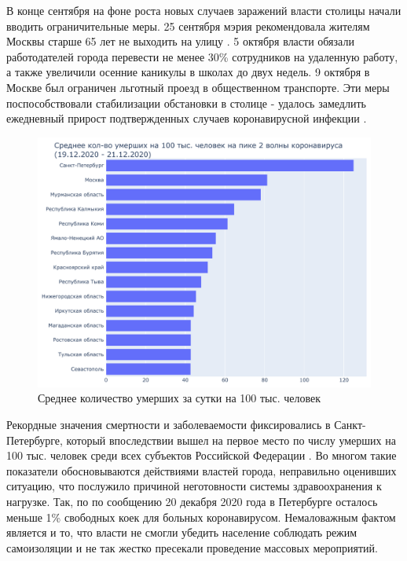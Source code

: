 \documentclass[a4paper, 12pt]{extarticle}
\begin{document}
В конце сентября на фоне роста новых случаев заражений власти столицы начали вводить ограничительные меры. 25 сентября мэрия рекомендовала жителям Москвы старше 65 лет не выходить на улицу . 5 октября власти обязали работодателей города перевести не менее 30\% сотрудников на удаленную работу, а также увеличили осенние каникулы в школах до двух недель. 9 октября в Москве был ограничен льготный проезд в общественном транспорте. Эти меры поспособствовали стабилизации обстановки в столице - удалось замедлить ежедневный прирост подтвержденных случаев коронавирусной инфекции .
\\

\begin{figure}[h]
    \centering
    \includegraphics[scale=0.6]{../plots/6total_deaths_per_100k_bar_plot_2wave.pdf}
    \caption{Среднее количество умерших за сутки на 100 тыс. человек}
    \label{fig:average_deaths_per_100k_2wave}
\end{figure}

Рекордные значения смертности и заболеваемости фиксировались в Санкт-Петербурге, который впоследствии вышел на первое место по числу умерших на 100 тыс. человек среди всех субъектов Российской Федерации . Во многом такие показатели обосновываются действиями властей города, неправильно оценивших ситуацию, что послужило причиной неготовности системы здравоохранения к нагрузке. Так, по по сообщению 20 декабря 2020 года в Петербурге осталось меньше 1\% свободных коек для больных коронавирусом. Немаловажным фактом является и то, что власти не смогли убедить население соблюдать режим самоизоляции и не так жестко пресекали проведение массовых мероприятий.
\\
\end{document}
